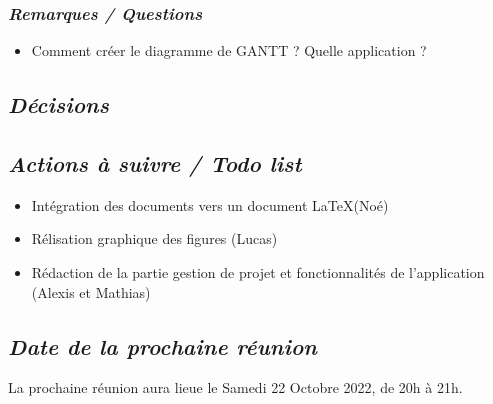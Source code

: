 \documentclass[french,a4paper]{article}
\begin{document}
\subsubsection*{\textit{Remarques / Questions}}
\begin{itemize}
  \item Comment créer le diagramme de GANTT ? Quelle application ?
\end{itemize}

\subsection*{\textit{Décisions}}


\subsection*{\textit{Actions à suivre / Todo list}}
\begin{itemize}
  \item Intégration des documents vers un document \LaTeX \space (Noé)
  \item Rélisation graphique des figures (Lucas)
  \item Rédaction de la partie gestion de projet et fonctionnalités de l'application (Alexis et Mathias)
\end{itemize}

\subsection*{\textit{Date de la prochaine réunion}}
La prochaine réunion aura lieue le Samedi 22 Octobre 2022, de 20h à 21h.
\end{document}

